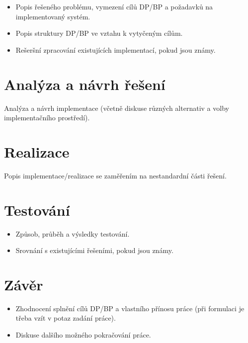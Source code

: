 \documentclass[11pt,twoside,a4paper]{book}
\begin{document}
\begin{itemize}
\begin{itemize}
\item Popis řešeného problému, vymezení cílů DP/BP a požadavků na implementovaný systém.
\item Popis struktury DP/BP ve vztahu k vytyčeným cílům.
\item Rešeršní zpracování existujících implementací, pokud jsou známy.
\end{itemize}

\chapter{Analýza a návrh řešení}
Analýza a návrh implementace (včetně diskuse různých alternativ a volby implementačního prostředí).


\chapter{Realizace}
Popis implementace/realizace se zaměřením na nestandardní části řešení.


\chapter{Testování}

\begin{itemize}
 \item Způsob, průběh a výsledky testování.
 \item Srovnání s existujícími řešeními, pokud jsou známy.
\end{itemize} 


\chapter{Závěr}

\begin{itemize}
\item Zhodnocení splnění cílů DP/BP a  vlastního přínosu práce (při formulaci je třeba vzít v potaz zadání práce).
\item Diskuse dalšího možného pokračování práce.
\end{itemize} 


\end{itemize}
\end{document}
